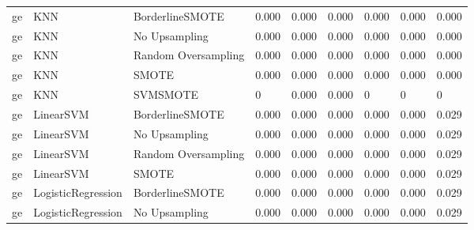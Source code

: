 \begin{tabular}{lllllllll}
      ge &                          KNN &     BorderlineSMOTE & 0.000 &                     0.000 &                 0.000 &                  0.000 &                                   0.000 &     0.000 \\
      ge &                          KNN &       No Upsampling & 0.000 &                     0.000 &                 0.000 &                  0.000 &                                   0.000 &     0.000 \\
      ge &                          KNN & Random Oversampling & 0.000 &                     0.000 &                 0.000 &                  0.000 &                                   0.000 &     0.000 \\
      ge &                          KNN &               SMOTE & 0.000 &                     0.000 &                 0.000 &                  0.000 &                                   0.000 &     0.000 \\
      ge &                          KNN &            SVMSMOTE &     0 &                     0.000 &                 0.000 &                      0 &                                       0 &         0 \\
      ge &                    LinearSVM &     BorderlineSMOTE & 0.000 &                     0.000 &                 0.000 &                  0.000 &                                   0.000 &     0.029 \\
      ge &                    LinearSVM &       No Upsampling & 0.000 &                     0.000 &                 0.000 &                  0.000 &                                   0.000 &     0.029 \\
      ge &                    LinearSVM & Random Oversampling & 0.000 &                     0.000 &                 0.000 &                  0.000 &                                   0.000 &     0.029 \\
      ge &                    LinearSVM &               SMOTE & 0.000 &                     0.000 &                 0.000 &                  0.000 &                                   0.000 &     0.029 \\
      ge &           LogisticRegression &     BorderlineSMOTE & 0.000 &                     0.000 &                 0.000 &                  0.000 &                                   0.000 &     0.029 \\
      ge &           LogisticRegression &       No Upsampling & 0.000 &                     0.000 &                 0.000 &                  0.000 &                                   0.000 &     0.029 \\

\end{tabular}
